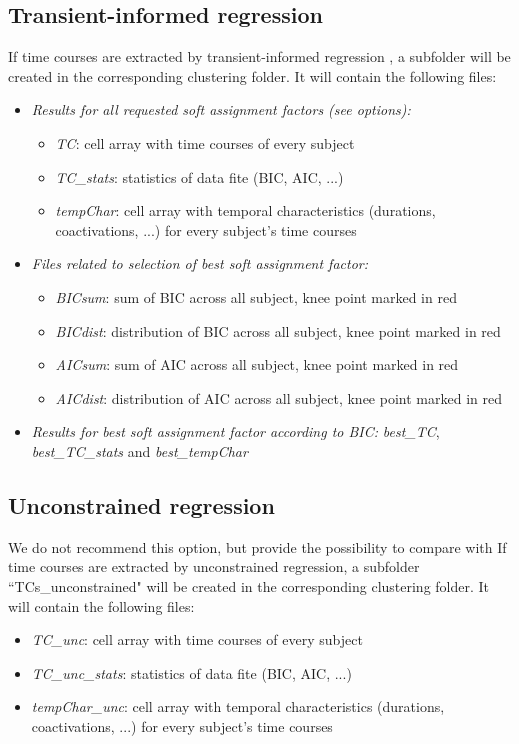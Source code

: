 \documentclass{article}
\begin{document}
\subsection{Transient-informed regression}
If time courses are extracted by transient-informed regression \cite{Zoller2018}, a subfolder will be created in the corresponding clustering folder. It will contain the following files:
\begin{itemize}
\item {\textit{Results for all requested soft assignment factors (see options):}
	\begin{itemize}
	\item \textit{TC}: cell array with time courses of every subject
	\item \textit{TC\_stats}: statistics of data fite (BIC, AIC, ...)
	\item \textit{tempChar}: cell array with temporal characteristics (durations, coactivations, ...) for every subject's time courses
	\end{itemize}}
\item {\textit{Files related to selection of best soft assignment factor:}
	\begin{itemize}
	\item \textit{BICsum}: sum of BIC across all subject, knee point marked in red
	\item \textit{BICdist}: distribution of BIC across all subject, knee point marked in red
	\item \textit{AICsum}: sum of AIC across all subject, knee point marked in red
	\item \textit{AICdist}: distribution of AIC across all subject, knee point marked in red
	\end{itemize}}
\item {\textit{Results for best soft assignment factor according to BIC:} \textit{best\_TC}, \textit{best\_TC\_stats} and \textit{best\_tempChar}}
\end{itemize}

\subsection{Unconstrained regression}
We do not recommend this option, but provide the possibility to compare with \cite{Karahanoglu2015,Bolton2018}
If time courses are extracted by unconstrained regression, a subfolder ``TCs\_unconstrained" will be created in the corresponding clustering folder. It will contain the following files:
\begin{itemize}
	\item \textit{TC\_unc}: cell array with time courses of every subject
	\item \textit{TC\_unc\_stats}: statistics of data fite (BIC, AIC, ...)
	\item \textit{tempChar\_unc}: cell array with temporal characteristics (durations, coactivations, ...) for every subject's time courses
\end{itemize}
\end{document}
